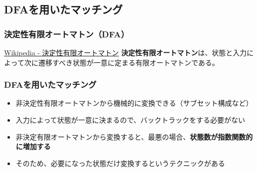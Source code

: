 \documentclass[12pt, unicode, svgnames, handout]{beamer}
\begin{document}
\subsection{DFAを用いたマッチング}
\begin{frame}[fragile]
  \frametitle{決定性有限オートマトン（DFA）}
  
  \begin{block}{}
    \begin{shadequote}[r]{\scriptsize\href{https://ja.wikipedia.org/wiki/\%E5\%B1\%BA\%E5\%AE\%9A\%E6\%80\%A7\%E6\%9C\%89\%E9\%99\%90\%E3\%82\%AA\%E3\%83\%BC\%E3\%83\%88\%E3\%83\%9E\%E3\%83\%88\%E3\%83\%B3}{Wikipedia - 決定性有限オートマトン}}
      \textbf{決定性有限オートマトン}は、状態と入力によって次に遷移すべき状態が一意に定まる有限オートマトンである。
    \end{shadequote}
  \end{block}

\end{frame}

\begin{frame}[fragile]
  \frametitle{DFAを用いたマッチング}
  
  \begin{itemize}
    \item<1-> 非決定性有限オートマトンから機械的に変換できる（サブセット構成など）
    \item<2-> 入力によって状態が一意に決まるので、バックトラックをする必要がない
    \item<3-> 非決定有限オートマトンから変換すると、最悪の場合、\textbf{状態数が指数関数的に増加する}
    \item<4-> そのため、必要になった状態だけ変換するというテクニックがある
  \end{itemize}
\end{frame}
\end{document}
